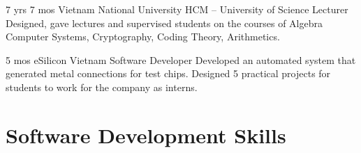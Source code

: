 \documentclass[11pt]{article} %
\begin{document}
\begin{paracol}{2}

{7 yrs 7 mos} %
{Vietnam National University HCM -- University of Science} %
{Lecturer} %
{Designed, gave lectures and supervised students on the courses of Algebra Computer Systems, Cryptography, Coding Theory, Arithmetics.} %


{5 mos} %
{eSilicon Vietnam} %
{Software Developer} %
{Developed an automated system that generated metal connections for test chips.
Designed 5 practical projects for students to work for the company as interns.} %


\vspace{-\baselineskip}\medskip %



\switchcolumn %



\section{Software Development Skills} 





\begin{supertabular}{rl} %


\end{supertabular}
\end{paracol}
\end{document}
